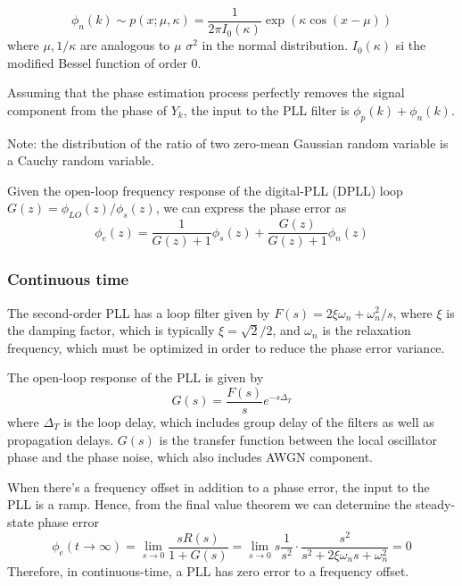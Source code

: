 \documentclass[a4paper]{article}
\begin{document}
\begin{equation} \label{eq:Tikhonov-pdf}
	\phi_n(k) \sim p(x; \mu, \kappa) = \frac{1}{2\pi I_0(\kappa)}\exp(\kappa\cos(x-\mu))
\end{equation}
where $\mu, 1/\kappa$ are analogous to $\mu$ $\sigma^2$ in the normal distribution. $I_0(\kappa)$ si the modified Bessel function of order 0.

Assuming that the phase estimation process perfectly removes the signal component from the phase of $Y_k$, the input to the PLL filter is $\phi_p(k) + \phi_n(k)$.

Note: the distribution of the ratio of two zero-mean Gaussian random variable is a Cauchy random variable.

Given the open-loop frequency response of the digital-PLL (DPLL) loop $G(z) = \phi_{LO}(z)/\phi_s(z)$, we can express the phase error as
\begin{equation}
	\phi_e(z) = \frac{1}{G(z)+1}\phi_s(z) + \frac{G(z)}{G(z) + 1}\phi_n(z)
\end{equation}


\subsubsection{Continuous time}

The second-order PLL has a loop filter given by $F(s) = 2\xi\omega_n + \omega_n^2/s$, where $\xi$ is the damping factor, which is typically $\xi = \sqrt{2}/2$, and $\omega_n$ is the relaxation frequency, which must be optimized in order to reduce the phase error variance.

The open-loop response of the PLL is given by
\begin{equation}
G(s) = \frac{F(s)}{s}e^{-s\Delta_T}
\end{equation}
where $\Delta_T$ is the loop delay, which includes group delay of the filters as well as propagation delays. $G(s)$ is the transfer function between the local oscillator phase and the phase noise, which also includes AWGN component. 

When there's a frequency offset in addition to a phase error, the input to the PLL is a ramp. Hence, from the final value theorem we can determine the steady-state phase error
\begin{equation}
\phi_e(t\to\infty) = \lim_{s\to 0} \frac{sR(s)}{1 + G(s)} = \lim_{s\to 0}s\frac{1}{s^2}\cdot\frac{s^2}{s^2 + 2\xi\omega_ns + \omega_n^2} = 0
\end{equation}
Therefore, in continuous-time, a PLL has zero error to a frequency offset.
\end{document}
